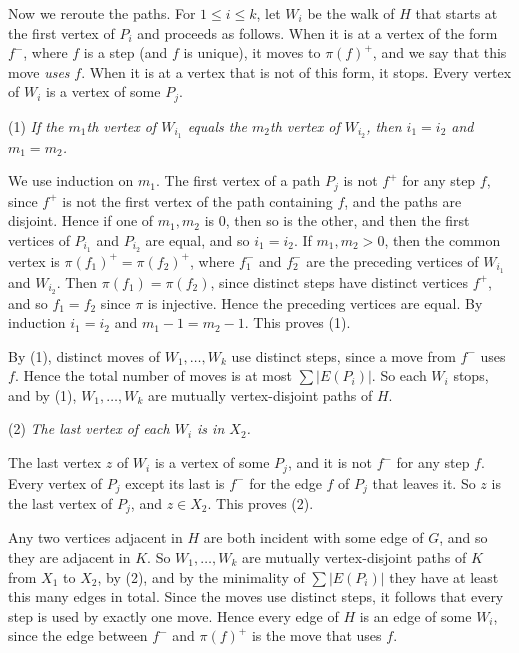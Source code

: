 {Now we reroute the paths. For $1 \le i \le k$, let $W_i$ be the walk of $H$ that starts at the
first vertex of $P_i$ and proceeds as follows. When it is at a vertex of the form $f^-$, where $f$
is a step (and $f$ is unique), it moves to $\pi(f)^+$, and we say that this move \textit{uses} $f$.
When it is at a vertex that is not of this form, it stops. Every vertex of $W_i$ is a vertex of some
$P_j$.

\hspace*{12pt}(1) \textit{If the $m_1$th vertex of $W_{i_1}$ equals the $m_2$th vertex of
$W_{i_2}$, then $i_1 = i_2$ and $m_1 = m_2$.}

We use induction on $m_1$. The first vertex of a path $P_j$ is not $f^+$ for any step $f$,
since $f^+$ is not the first vertex of the path containing $f$, and the paths are disjoint. Hence if one of $m_1, m_2$ is $0$, then so is the other, and then the first
vertices of $P_{i_1}$ and $P_{i_2}$ are equal, and so $i_1 = i_2$. If $m_1, m_2 > 0$, then the
common vertex is $\pi(f_1)^+ = \pi(f_2)^+$, where $f_1^-$ and $f_2^-$ are the preceding vertices of
$W_{i_1}$ and $W_{i_2}$. Then $\pi(f_1) = \pi(f_2)$, since distinct steps have distinct
vertices $f^+$, and so $f_1 = f_2$ since $\pi$ is injective. Hence the preceding vertices are equal. By induction $i_1 = i_2$ and $m_1 - 1 = m_2 - 1$. This proves (1).

By (1), distinct moves of $W_1, \dots, W_k$ use distinct steps, since a move from $f^-$ uses $f$.
Hence the total number of moves is at most $\sum |E(P_i)|$. So each $W_i$ stops, and by (1),
$W_1, \dots, W_k$ are mutually vertex-disjoint paths of $H$.

\hspace*{12pt}(2) \textit{The last vertex of each $W_i$ is in $X_2$.}

The last vertex $z$ of $W_i$ is a vertex of some $P_j$, and it is not $f^-$ for any step $f$. Every
vertex of $P_j$ except its last is $f^-$ for the edge $f$ of $P_j$ that leaves it. So $z$ is the
last vertex of $P_j$, and $z \in X_2$. This proves (2).

Any two vertices adjacent in $H$ are both incident with some edge of $G$, and so they are adjacent
in $K$. So $W_1, \dots, W_k$ are mutually vertex-disjoint paths of $K$ from $X_1$ to $X_2$, by (2),
and by the minimality of $\sum |E(P_i)|$ they have at least this many edges in total. Since the
moves use distinct steps, it follows that every step is used by exactly one move. Hence every edge
of $H$ is an edge of some $W_i$, since the edge between $f^-$ and $\pi(f)^+$ is the move that uses
$f$.

}
